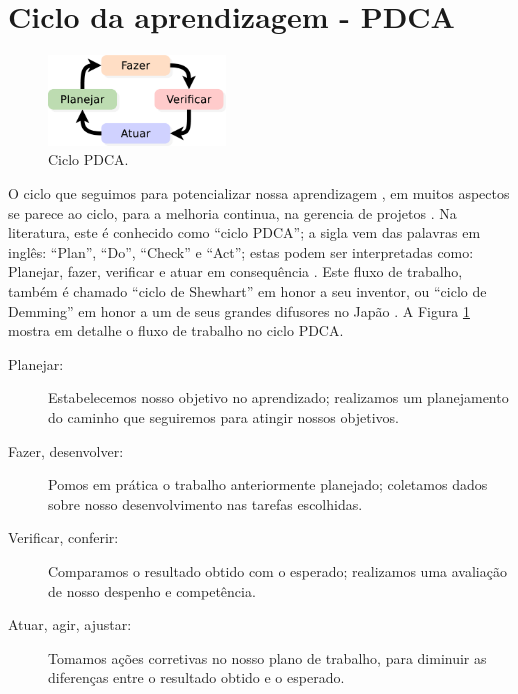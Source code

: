\section{Ciclo da aprendizagem - PDCA}
\label{sec:cicloaprendizagem}

\begin{figure}
  \centering
  \vspace{-10pt}
    \includegraphics[width=0.42\textwidth]{chapters/cap-learning/ciclo2.eps}
  \vspace{-10pt}
\caption{Ciclo PDCA.}
\label{fig:ciclopdca}
\end{figure}
O ciclo que seguimos para potencializar nossa aprendizagem \cite[pp. 13]{mumford2001aprendendo},
em muitos aspectos se parece ao ciclo, para a melhoria continua, na gerencia de projetos 
\cite[pp. 4]{caloba2018gerenciamento} \cite[pp. 59]{teixeira2018gestao}.
Na literatura, este é conhecido como ``ciclo PDCA'';
a sigla vem das palavras em inglês: ``Plan'', ``Do'', ``Check'' e ``Act'';
estas podem ser interpretadas como: Planejar, fazer, verificar e atuar em consequência
\cite[pp. 59]{teixeira2018gestao} \cite[pp. 4]{caloba2018gerenciamento}.
Este fluxo de trabalho, também é chamado ``ciclo de Shewhart'' em honor a seu inventor,
ou ``ciclo de Demming'' em honor a um de seus grandes difusores no Japão
\cite[pp. 59]{teixeira2018gestao} \cite[pp. 4]{caloba2018gerenciamento}.
A Figura \ref{fig:ciclopdca} mostra em detalhe o fluxo de trabalho no ciclo PDCA.


\begin{description}
\item[Planejar:] Estabelecemos nosso objetivo no aprendizado; 
realizamos um planejamento do caminho que seguiremos para atingir nossos objetivos.
\item[Fazer, desenvolver:] Pomos em prática o trabalho anteriormente planejado;
coletamos dados sobre nosso desenvolvimento nas tarefas escolhidas.
\item[Verificar, conferir:] Comparamos o resultado obtido com o esperado;
realizamos uma avaliação de nosso despenho e competência.
\item[Atuar, agir, ajustar:] Tomamos ações corretivas no nosso plano de trabalho,
para diminuir as diferenças entre o resultado obtido e o esperado.
\end{description}
